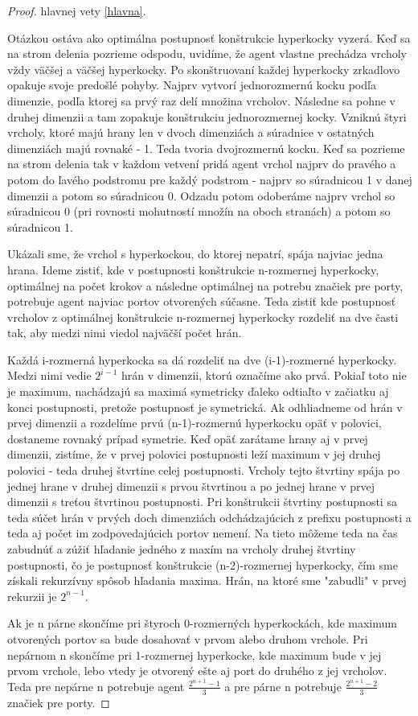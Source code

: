\begin{proof} hlavnej vety \ref{hlavna}.

Otázkou ostáva ako optimálna postupnosť konštrukcie hyperkocky vyzerá. 
Keď sa na strom delenia pozrieme
odspodu, uvidíme, že agent vlastne prechádza vrcholy vždy väčšej a väčšej 
hyperkocky.
Po skonštruovaní každej hyperkocky zrkadlovo opakuje svoje predošlé pohyby. 
Najprv vytvorí
jednorozmernú kocku podľa dimenzie, podľa ktorej sa prvý raz delí množina
vrcholov. Následne sa pohne v druhej dimenzii a tam zopakuje konštrukciu
jednorozmernej kocky. Vzniknú štyri vrcholy, ktoré majú hrany len v dvoch
dimenziách a súradnice v ostatných dimenziách majú rovnaké - 1. Teda tvoria
dvojrozmernú kocku. Keď sa pozrieme na strom delenia tak v každom vetvení
pridá agent vrchol najprv do pravého a potom do ľavého podstromu pre každý
podstrom - najprv so
súradnicou 1 v danej dimenzii a potom so súradnicou 0. Odzadu potom
odoberáme najprv vrchol so súradnicou 0 (pri rovnosti mohutností množín 
na oboch stranách) a potom so súradnicou 1.

Ukázali sme, že vrchol s hyperkockou, do ktorej nepatrí, spája najviac jedna
hrana. Ideme zistiť, kde v postupnosti konštrukcie n-rozmernej hyperkocky,
optimálnej na počet krokov a následne optimálnej na potrebu značiek pre porty,
 potrebuje
agent najviac portov otvorených súčasne. Teda zistiť kde postupnosť vrcholov z
 optimálnej konštrukcie n-rozmernej hyperkocky rozdeliť na dve časti tak,
aby medzi nimi viedol najväčší počet hrán. 

Každá i-rozmerná hyperkocka sa dá
rozdeliť na dve (i-1)-rozmerné hyperkocky. Medzi nimi vedie $2^{i-1}$
hrán v dimenzii, ktorú označíme ako prvá. Pokiaľ toto nie je maximum, 
nachádzajú sa maximá symetricky ďaleko odtiaľto v začiatku aj konci
postupnosti,
pretože postupnosť je symetrická. Ak odhliadneme od hrán v prvej dimenzii a
rozdelíme prvú (n-1)-rozmernú hyperkocku opäť v polovici, dostaneme rovnaký
prípad symetrie. Keď opäť zarátame hrany aj v prvej dimenzii, zistíme, že v
prvej polovici postupnosti leží maximum v jej druhej polovici - teda druhej
štvrtine celej postupnosti. Vrcholy tejto štvrtiny spája po jednej hrane v
druhej dimenzii s prvou štvrtinou a po jednej hrane v prvej dimenzii s
treťou štvrtinou postupnosti. Pri konštrukcii štvrtiny postupnosti sa teda 
súčet hrán v prvých doch dimenziách odchádzajúcich z prefixu postupnosti 
a teda aj
počet im zodpovedajúcich portov nemení. Na tieto môžeme teda na čas zabudnúť 
a zúžiť hľadanie
jedného z maxím na vrcholy druhej štvrtiny postupnosti, čo je postupnosť
konštrukcie (n-2)-rozmernej hyperkocky, čím sme získali rekurzívny spôsob
hľadania maxima. Hrán, na ktoré sme "zabudli" v prvej rekurzii je $2^{n-1}$.

Ak je n párne skončíme pri štyroch 0-rozmerných hyperkockách, kde maximum
otvorených portov sa bude dosahovať v prvom alebo druhom vrchole. Pri
nepárnom n skončíme pri 1-rozmernej hyperkocke, kde maximum bude v jej prvom
vrchole, lebo vtedy je otvorený ešte aj port do druhého z jej vrcholov.
Teda pre nepárne n potrebuje agent $\frac{2^{n+1} - 1}{3}$ a pre
párne n potrebuje $\frac{2^{n+1} - 2}{3}$ značiek pre porty.
\end{proof}

